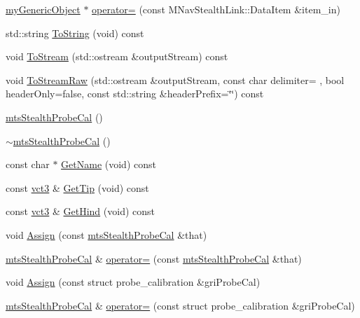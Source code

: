 \begin{DoxyCompactItemize}
\hyperlink{classmy_generic_object}{my\+Generic\+Object} $\ast$ \hyperlink{classmts_stealth_probe_cal_ac9426e0e33a2439962ce6499976441df}{operator=} (const M\+Nav\+Stealth\+Link\+::\+Data\+Item \&item\+\_\+in)
\item 
std\+::string \hyperlink{classmts_stealth_probe_cal_a004a8c73e318b8357ba895e24c598879}{To\+String} (void) const 
\item 
void \hyperlink{classmts_stealth_probe_cal_a8269e2a53a6d7855c7385873c1a74a0e}{To\+Stream} (std\+::ostream \&output\+Stream) const 
\item 
void \hyperlink{classmts_stealth_probe_cal_a7399576b98cc2bb01a68628d7c1d93f9}{To\+Stream\+Raw} (std\+::ostream \&output\+Stream, const char delimiter= \textquotesingle{} \textquotesingle{}, bool header\+Only=false, const std\+::string \&header\+Prefix=\char`\"{}\char`\"{}) const 
\item 
\hyperlink{classmts_stealth_probe_cal_a23a543dfab9d3e23f83078f7356c01c2}{mts\+Stealth\+Probe\+Cal} ()
\item 
\hyperlink{classmts_stealth_probe_cal_a7d648415188646162fde6fd4e7c198e2}{$\sim$mts\+Stealth\+Probe\+Cal} ()
\item 
const char $\ast$ \hyperlink{classmts_stealth_probe_cal_ac5d897e409c52bb39b0609be832b5280}{Get\+Name} (void) const 
\item 
const \hyperlink{vct_fixed_size_vector_types_8h_a3af82acdbf4eeb73c551909240b106ea}{vct3} \& \hyperlink{classmts_stealth_probe_cal_aef0ca077dd8812b6f8686216b649fc7e}{Get\+Tip} (void) const 
\item 
const \hyperlink{vct_fixed_size_vector_types_8h_a3af82acdbf4eeb73c551909240b106ea}{vct3} \& \hyperlink{classmts_stealth_probe_cal_abed5877dd697b53d5010c86b3c1637ec}{Get\+Hind} (void) const 
\item 
void \hyperlink{classmts_stealth_probe_cal_a1d42d1f6f752c03028a4880b1463d77d}{Assign} (const \hyperlink{classmts_stealth_probe_cal}{mts\+Stealth\+Probe\+Cal} \&that)
\item 
\hyperlink{classmts_stealth_probe_cal}{mts\+Stealth\+Probe\+Cal} \& \hyperlink{classmts_stealth_probe_cal_a72ee5ec4d3d020c08fac6d97b369fad6}{operator=} (const \hyperlink{classmts_stealth_probe_cal}{mts\+Stealth\+Probe\+Cal} \&that)
\item 
void \hyperlink{classmts_stealth_probe_cal_a40d6ebfc91323afd2a504d03f82542d1}{Assign} (const struct probe\+\_\+calibration \&gri\+Probe\+Cal)
\item 
\hyperlink{classmts_stealth_probe_cal}{mts\+Stealth\+Probe\+Cal} \& \hyperlink{classmts_stealth_probe_cal_a01847095e7208b7ca2285e0530afbfed}{operator=} (const struct probe\+\_\+calibration \&gri\+Probe\+Cal)

\end{DoxyCompactItemize}
